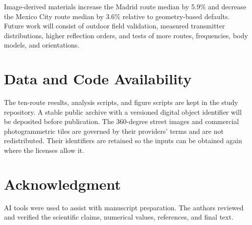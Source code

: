 \documentclass{IEEEoj}
\begin{document}
Image-derived materials increase the Madrid route median by 5.9\% and decrease
the Mexico City route median by 3.6\% relative to geometry-based defaults.
Future work will consist of outdoor field validation, measured transmitter
distributions, higher reflection orders, and tests of more routes, frequencies,
body models, and orientations.

\section*{Data and Code Availability}

The ten-route results, analysis scripts, and figure scripts are kept in the
study repository. A stable public archive with a versioned digital object
identifier will be deposited before publication. The 360-degree street images
and commercial photogrammetric tiles are governed by their providers' terms and
are not redistributed. Their identifiers are retained so the inputs can be
obtained again where the licenses allow it.

\section*{Acknowledgment}

AI tools were used to assist with manuscript preparation. The authors reviewed
and verified the scientific claims, numerical values, references, and final
text.
\end{document}
